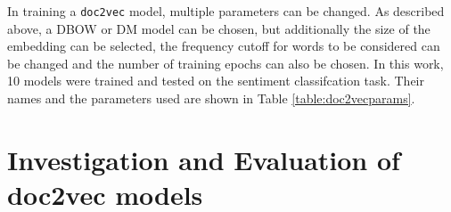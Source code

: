 \documentclass[twocolumn]{article}
\begin{document}
In training a \texttt{doc2vec} model, multiple parameters can be changed. As described above, a DBOW or DM model can be chosen, but additionally the size of the embedding can be selected, the frequency cutoff for words to be considered can be changed and the number of training epochs can also be chosen. In this work, 10 models were trained and tested on the sentiment classifcation task. Their names and the parameters used are shown in Table \ref{table:doc2vecparams}.

\section{Investigation and Evaluation of doc2vec models}

\end{document}
